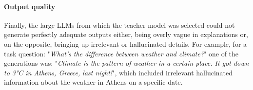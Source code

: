 \documentclass{article}
\begin{document}

\paragraph{Output quality}
Finally, the large LLMs from which the teacher model was selected could not generate perfectly adequate outputs either, being overly vague in explanations or, on the opposite, bringing up irrelevant or hallucinated details. For example, for a task question: "\textit{What's the difference between weather and climate?}" one of the generations was: "\textit{Climate is the pattern of weather in a certain place. It got down to 3°C in Athens, Greece, last night!}", which included irrelevant hallucinated information about the weather in Athens on a specific date. 

\end{document}
